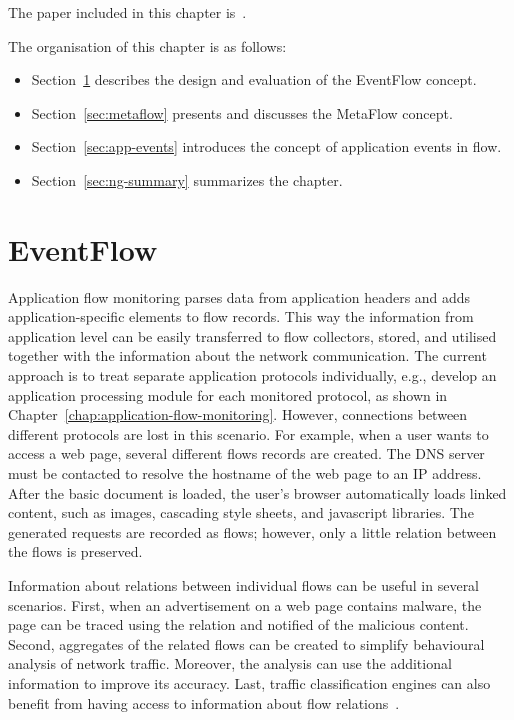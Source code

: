 \begin{chapintro}
The paper included in this chapter is~\cite{Velan-2016-EventFlow}.

The organisation of this chapter is as follows:
\begin{itemize}
  \item Section~\ref{sec:eventflow} describes the design and evaluation of the EventFlow concept.
  \item Section~\ref{sec:metaflow} presents and discusses the MetaFlow concept.
  \item Section~\ref{sec:app-events} introduces the concept of application events in flow.
  \item Section~\ref{sec:ng-summary} summarizes the chapter.
\end{itemize}

\end{chapintro}

\newpage

\section{EventFlow}\label{sec:eventflow}

Application flow monitoring parses data from application headers and adds application-specific elements to flow records. This way the information from application level can be easily transferred to flow collectors, stored, and utilised together with the information about the network communication. The current approach is to treat separate application protocols individually, e.g., develop an application processing module for each monitored protocol, as shown in Chapter~\ref{chap:application-flow-monitoring}. However, connections between different protocols are lost in this scenario. For example, when a user wants to access a web page, several different flows records are created. The DNS server must be contacted to resolve the hostname of the web page to an IP address. After the basic document is loaded, the user's browser automatically loads linked content, such as images, cascading style sheets, and javascript libraries. The generated requests are recorded as flows; however, only a little relation between the flows is preserved.

Information about relations between individual flows can be useful in several scenarios. First, when an advertisement on a web page contains malware, the page can be traced using the relation and notified of the malicious content. Second, aggregates of the related flows can be created to simplify behavioural analysis of network traffic. Moreover, the analysis can use the additional information to improve its accuracy. Last, traffic classification engines can also benefit from having access to information about flow relations~\cite{Wang-2014-Internet}.

